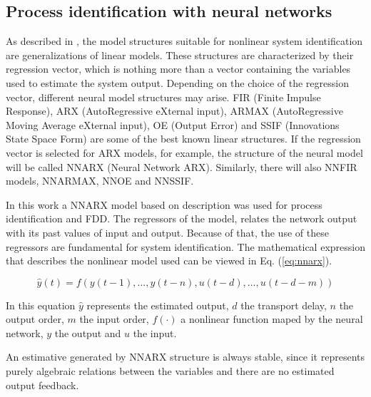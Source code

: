 \documentclass[10pt,fleqn,a4paper]{article}
\newcommand{\parent}[1]{\left(#1\right)}
\begin{document}
\subsection{Process identification with neural networks}
As described in \citet{lucena:2005}, the model structures suitable for nonlinear
system identification are generalizations of linear models. These structures are
characterized by their regression vector, which is nothing more than a vector
containing the variables used to estimate the system output.  Depending on the
choice of the regression vector, different neural model structures may arise.
FIR (Finite Impulse Response), ARX (AutoRegressive eXternal input), ARMAX
(AutoRegressive Moving Average eXternal input), OE (Output Error) and SSIF
(Innovations State Space Form) are some of the best known linear structures. If
the regression vector is selected for ARX models, for example, the structure of
the neural model will be called NNARX (Neural Network ARX). Similarly, there
will also NNFIR models, NNARMAX, NNOE and NNSSIF.

In this work a NNARX model based on \citet{norgaard:2000} description was used
for process identification and FDD. The regressors of the model, relates the
network output with its past values of input and output. Because of that, the
use of these regressors are fundamental for system identification. The
mathematical expression that describes the nonlinear model used can be viewed in
Eq. (\ref{eq:nnarx}).

\begin{equation}
\label{eq:nnarx}
\hat{y}(t) = f\parent{y(t-1), \ldots, y(t-n), u(t-d), \ldots, u(t-d-m)}
\end{equation}

In this equation $\hat{y}$ represents the estimated output, $d$ the transport
delay, $n$ the output order, $m$ the input order, $f( \cdotp )$ a nonlinear
function maped by the neural network, $y$ the output and $u$ the input.

An estimative generated by NNARX structure is always stable, since it represents
purely algebraic relations between the variables and there are no estimated
output feedback.
\end{document}
